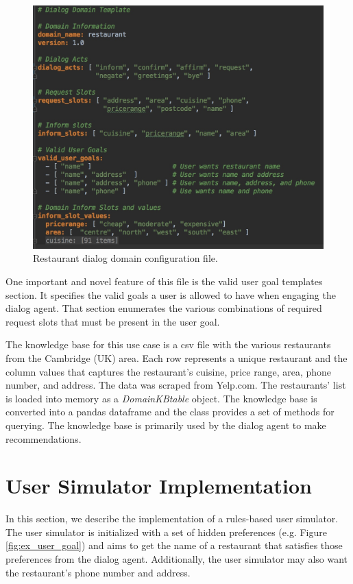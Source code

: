\begin{figure}[h!]
	\centering
	\includegraphics[scale=.25]{diagrams/sample_domain.jpeg}
	\caption{ Restaurant dialog domain configuration file. }
	\label{fig:restaurant_domain}
\end{figure}

One important and novel feature of this file is the valid user goal templates section. It specifies the valid goals a user is allowed to have when engaging the dialog agent. That section enumerates the various combinations of required request slots that must be present in the user goal.

The knowledge base for this use case is a csv file with the various restaurants from the Cambridge (UK) area. Each row represents a unique restaurant and the column values that captures the restaurant's cuisine, price range, area, phone number, and address. The data was scraped from Yelp.com. The restaurants' list is loaded into memory as a \textit{DomainKBtable} object. The knowledge base is converted into a pandas dataframe and the class provides a set of methods for querying. The knowledge base is primarily used by the dialog agent to make recommendations.

\section{User Simulator Implementation}

In this section, we describe the implementation of a rules-based user simulator. The user simulator is initialized with a set of hidden preferences (e.g. Figure \ref{fig:ex_user_goal}) and aims to get the name of a restaurant that satisfies those preferences from the dialog agent. Additionally, the user simulator may also want the restaurant's phone number and address.

